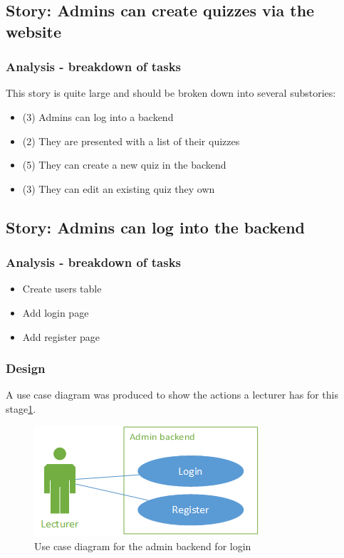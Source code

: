 \subsection{Story: Admins can create quizzes via the website}
\subsubsection{Analysis - breakdown of tasks}
This story is quite large and should be broken down into several substories:
\begin{itemize}
	\item (3) Admins can log into a backend
	\item (2) They are presented with a list of their quizzes
	\item (5) They can create a new quiz in the backend
	\item (3) They can edit an existing quiz they own
\end{itemize}
\newpage

\subsection{Story: Admins can log into the backend}
\subsubsection{Analysis - breakdown of tasks}
\begin{itemize}
	\item Create users table
	\item Add login page
	\item Add register page
\end{itemize}
\subsubsection{Design}
A use case diagram was produced to show the actions a lecturer has for this stage\ref{fig:login-use-case}.

\begin{figure}
	\caption{Use case diagram for the admin backend for login}
	\centerline{\includegraphics{Chapter2/Iter-1/iter-1-use-case}}
	\label{fig:login-use-case}
\end{figure}

